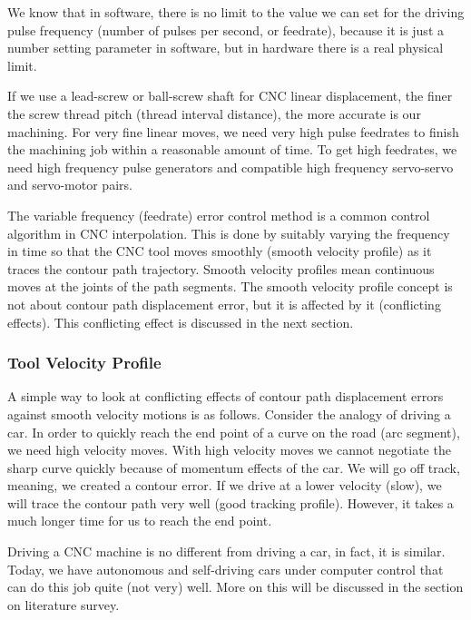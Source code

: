 We know that in software, there is no limit to the value we can set for the driving pulse frequency (number of pulses per second, or feedrate), because it is just a number setting parameter in software, but in hardware there is a real physical limit.
\vspace*{1\baselineskip}

If we use a lead-screw or ball-screw shaft for CNC linear displacement, the finer the screw thread pitch (thread interval distance), the more accurate is our machining. For very fine linear moves, we need very high pulse feedrates to finish the machining job within a reasonable amount of time. To get high feedrates, we need high frequency pulse generators and compatible high frequency servo-servo and servo-motor pairs.  

\begin{tcolorbox}[colback=green!15!white,colframe=red!75!black,title=Research consideration no. 1]
\justifying
The	variable frequency (feedrate) error control method is a common control algorithm in CNC interpolation. This is done by suitably varying the frequency in time so that the CNC tool moves smoothly (smooth velocity profile) as it traces the contour path trajectory. Smooth velocity profiles mean continuous moves at the joints of the path segments. The smooth velocity profile concept is not about contour path displacement error, but it is affected by it (conflicting effects). This conflicting effect is discussed in the next section.  
\end{tcolorbox}

\subsubsection{Tool Velocity Profile}

A simple way to look at conflicting effects of contour path displacement errors against smooth velocity motions is as follows. Consider the analogy of driving a car. In order to quickly reach the end point of a curve on the road (arc segment), we need high velocity moves. With high velocity moves we cannot negotiate the sharp curve quickly because of momentum effects of the car. We will go off track, meaning, we created a contour error. If we drive at a lower velocity (slow), we will trace the contour path very well (good tracking profile). However, it takes a much longer time for us to reach the end point. 
\vspace*{1\baselineskip}

Driving a CNC machine is no different from driving a car, in fact, it is similar. Today, we have autonomous and self-driving cars under computer control that can do this job quite (not very) well. More on this will be discussed in the section on literature survey.
\vspace*{1\baselineskip}

